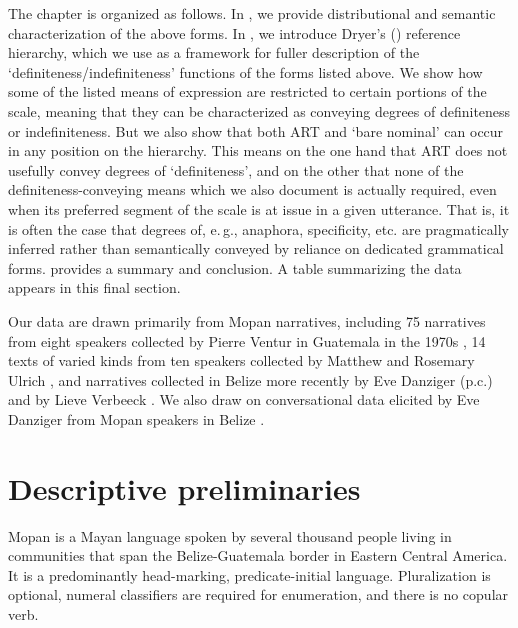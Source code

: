 \documentclass[output=paper]{langsci/langscibook}
\begin{document}
The chapter is organized as follows.  In , we provide distributional and semantic characterization of the above forms.  In , we introduce Dryer's (\citeyear{dryer:14}) reference hierarchy, which we use as a framework for fuller description of the `definiteness/indefiniteness' functions of the forms listed above.  We show how some of the listed means of expression are restricted to certain portions of the scale, meaning that they can be characterized as conveying degrees of definiteness or indefiniteness. But we also show that both ART and `bare nominal' can occur in any position on the hierarchy. This means on the one hand that ART does not usefully convey degrees of `definiteness', and on the other that  none of the definiteness-conveying means which we also document is actually required, even when its preferred segment of the scale is at issue in a given utterance. That is, it is often the case that degrees of, e.\,g., anaphora, specificity, etc. are pragmatically inferred rather than semantically conveyed by reliance on dedicated grammatical forms.  provides a summary and conclusion. A table summarizing the data appears in this final section.

Our data are drawn primarily from Mopan narratives, including 75 narratives from eight speakers collected by Pierre Ventur in Guatemala in the 1970s \citep{ventur:76}, 14 texts of varied kinds from ten speakers collected by Matthew and Rosemary Ulrich \citep{ulrich:ulrich:82}, and narratives collected in Belize more recently by Eve Danziger (p.c.) and by Lieve Verbeeck \citep{verbeeck:99}. We also draw on conversational data elicited by Eve Danziger from Mopan speakers in Belize \citep{danziger:94}.


\section{Descriptive preliminaries}\label{3sec:2}

{
Mopan is a Mayan language spoken by several thousand people living in communities that span the Belize-Guatemala border in Eastern Central America.  It is a predominantly head-marking, predicate-initial language. Pluralization is optional, numeral classifiers are required for enumeration, and there is no copular verb.
}
\end{document}
